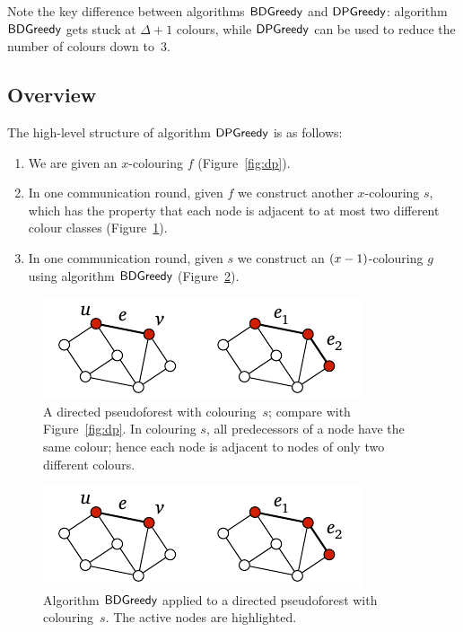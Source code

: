 Note the key difference between algorithms $\textup{\sffamily BDGreedy}$ and $\textup{\sffamily DPGreedy}$: algorithm $\textup{\sffamily BDGreedy}$ gets stuck at $\Delta+1$ colours, while $\textup{\sffamily DPGreedy}$ can be used to reduce the number of colours down to~$3$.


\subsection{Overview}

The high-level structure of algorithm $\textup{\sffamily DPGreedy}$ is as follows:
\begin{enumerate}
    \item We are given an $x$-colouring $f$ (Figure~\ref{fig:dp}).
    \item In one communication round, given $f$ we construct another $x$-colouring $s$, which has the property that each node is adjacent to at most two different colour classes (Figure~\ref{fig:dpsuccessor}).
    \item In one communication round, given $s$ we construct an $(x-\nobreak 1)$-colouring $g$ using algorithm $\textup{\sffamily BDGreedy}$ (Figure~\ref{fig:dpgreedy}).
\end{enumerate}

\begin{figure}
    \centering
    \includegraphics[page=\PDPSuccessor]{figs.pdf}
    \caption{A directed pseudoforest with colouring~$s$; compare with Figure~\ref{fig:dp}. In colouring $s$, all predecessors of a node have the same colour; hence each node is adjacent to nodes of only two different colours.}\label{fig:dpsuccessor}
\end{figure}

\begin{figure}
    \centering
    \includegraphics[page=\PDPGreedy]{figs.pdf}
    \caption{Algorithm $\textup{\sffamily BDGreedy}$ applied to a directed pseudoforest with colouring~$s$. The active nodes are highlighted.}\label{fig:dpgreedy}
\end{figure}


